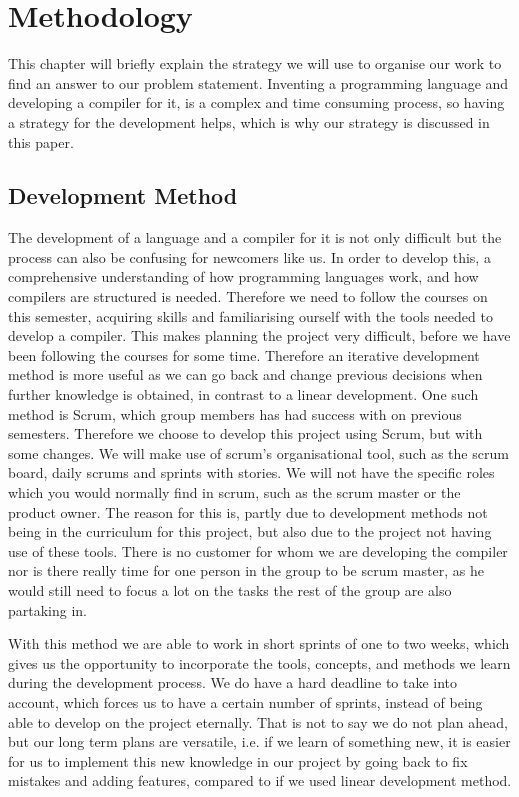 \chapter{Methodology}\label{chap:methdology}

This chapter will briefly explain the strategy we will use to organise our work to find an answer to our problem statement. 
Inventing a programming language and developing a compiler for it, is a complex and time consuming process, so having a strategy for the development helps, which is why our strategy is discussed in this paper.

\section{Development Method}
The development of a language and a compiler for it is not only difficult but the process can also be confusing for newcomers like us. 
In order to develop this, a comprehensive understanding of how programming languages work, and how compilers are structured is needed.
Therefore we need to follow the courses on this semester, acquiring skills and familiarising ourself with the tools needed to develop a compiler.
This makes planning the project very difficult, before we have been following the courses for some time.
Therefore an iterative development method is more useful as we can go back and change previous decisions when further knowledge is obtained, in contrast to a linear development.
One such method is Scrum, which group members has had success with on previous semesters.
Therefore we choose to develop this project using Scrum, but with some changes.
We will make use of scrum's organisational tool, such as the scrum board, daily scrums and sprints with stories.
We will not have the specific roles which you would normally find in scrum, such as the scrum master or the product owner. \citep{Scrum}
The reason for this is, partly due to development methods not being in the curriculum for this project, but also due to the project not having use of these tools.
There is no customer for whom we are developing the compiler nor is there really time for one person in the group to be scrum master, as he would still need to focus a lot on the tasks the rest of the group are also partaking in.

With this method we are able to work in short sprints of one to two weeks, which gives us the opportunity to incorporate the tools, concepts, and methods we learn during the development process.
We do have a hard deadline to take into account, which forces us to have a certain number of sprints, instead of being able to develop on the project eternally.
That is not to say we do not plan ahead, but our long term plans are versatile, i.e. if we learn of something new, it is easier for us to implement this new knowledge in our project by going back to fix mistakes and adding features, compared to if we used linear development method.

